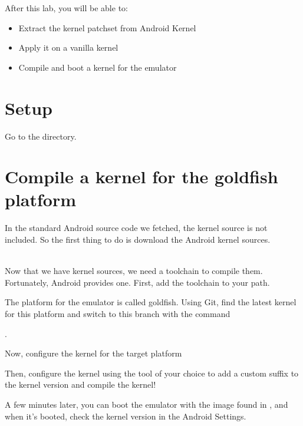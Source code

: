 
After this lab, you will be able to:
\begin{itemize}
  \item Extract the kernel patchset from Android Kernel
  \item Apply it on a vanilla kernel
  \item Compile and boot a kernel for the emulator
\end{itemize}

\section{Setup}

Go to the  directory.

\section{Compile a kernel for the goldfish platform}

In the standard Android source code we fetched, the kernel source is not included.
So the first thing to do is download the Android kernel sources.

\\

Now that we have kernel sources, we need a toolchain to compile them. Fortunately,
Android provides one. First, add the toolchain to your path.


The platform for the emulator is called goldfish. Using Git, find the latest
kernel for this platform and switch to this branch with the command 

.

Now, configure the kernel for the target platform


Then, configure the kernel using the tool of your choice to add a custom suffix
to the kernel version and compile the kernel!


A few minutes later, you can boot the emulator with the image found in
, and when it's booted, check the kernel version in the
Android Settings.

